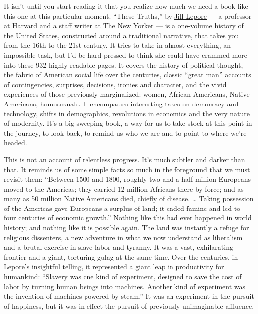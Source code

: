 It isn't until you start reading it that you realize how much we need a
book like this one at this particular moment. ``These Truths,'' by
\href{https://www.nytimes3xbfgragh.onion/2018/09/16/books/jill-lepore-on-the-history-of-america-in-1000-pages-or-less.html}{Jill
Lepore} --- a professor at Harvard and a staff writer at The New Yorker
--- is a one-volume history of the United States, constructed around a
traditional narrative, that takes you from the 16th to the 21st century.
It tries to take in almost everything, an impossible task, but I'd be
hard-pressed to think she could have crammed more into these 932 highly
readable pages. It covers the history of political thought, the fabric
of American social life over the centuries, classic ``great man''
accounts of contingencies, surprises, decisions, ironies and character,
and the vivid experiences of those previously marginalized: women,
African-Americans, Native Americans, homosexuals. It encompasses
interesting takes on democracy and technology, shifts in demographics,
revolutions in economics and the very nature of modernity. It's a big
sweeping book, a way for us to take stock at this point in the journey,
to look back, to remind us who we are and to point to where we're
headed.

This is not an account of relentless progress. It's much subtler and
darker than that. It reminds us of some simple facts so much in the
foreground that we must revisit them: ``Between 1500 and 1800, roughly
two and a half million Europeans moved to the Americas; they carried 12
million Africans there by force; and as many as 50 million Native
Americans died, chiefly of disease. \ldots{} Taking possession of the
Americas gave Europeans a surplus of land; it ended famine and led to
four centuries of economic growth.'' Nothing like this had ever happened
in world history; and nothing like it is possible again. The land was
instantly a refuge for religious dissenters, a new adventure in what we
now understand as liberalism and a brutal exercise in slave labor and
tyranny. It was a vast, exhilarating frontier and a giant, torturing
gulag at the same time. Over the centuries, in Lepore's insightful
telling, it represented a giant leap in productivity for humankind:
``Slavery was one kind of experiment, designed to save the cost of labor
by turning human beings into machines. Another kind of experiment was
the invention of machines powered by steam.'' It was an experiment in
the pursuit of happiness, but it was in effect the pursuit of previously
unimaginable affluence.

